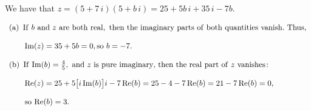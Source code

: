 We have that $z=(5+7\,i)(5+b\,i)=25+5b\,i+35\,i-7b$.

$
\begin{array}[h!]{l}
{\rm (a)}\hskip5pt {\rm If}\ b\ {\rm and}\ z\ {\rm are\ both\ real},\ {\rm then\ the \ imaginary\
parts\ of\ both\ quantities\ vanish.}\ {\rm Thus,}\\
\noalign{\vskip12pt}
\hskip20pt {\rm Im}(z)=35+5b=0, {\rm so}\ b=-7.\\
\noalign{\vskip12pt}
{\rm (b)}\hskip5pt {\rm If}\ {\rm Im}(b)={4\over5},\ {\rm and}\ z\ {\rm is\ pure\ imaginary,}\
{\rm then\ the\ real\ part\ of}\ z\ {\rm vanishes\!:}\\
\noalign{\vskip12pt}
\hskip20pt{\rm Re}(z)=25+5\bigl[i\,{\rm Im}(b)\bigr]i-7\,{\rm Re}(b)=25-4-7\,{\rm Re}(b)=21-7\,{\rm
Re}(b)=0,\\
\noalign{\vskip12pt}
\hskip20pt{\rm so}\ {\rm Re}(b)=3.
\end{array}
$
